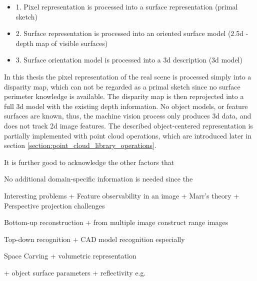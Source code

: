 \documentclass[12pt,a4paper,oneside,pdftex]{report}
\begin{document}
{\begin{itemize}
\label{list:objectcenteredmodeling}
\setlength{\itemsep}{0pt}
\item 1. Pixel representation is processed into a surface representation (primal sketch)
\item 2. Surface representation is processed into an oriented surface model (2.5d - depth map of visible surfaces)
\item 3. Surface orientation model is processed into a 3d description (3d model)
\end{itemize}

\cite{Sonka07}

In this thesis the pixel representation of the real scene is processed simply into a disparity map, which can not be regarded as a primal sketch since no surface perimeter knowledge is available. The disparity map is then reprojected into a full 3d model with the existing depth information. No object models, or feature surfaces are known, thus, the machine vision process only produces 3d data, and does not track 2d image features. The described object-centered representation is partially implemented with point cloud operations, which are introduced later in section \ref{section:point_cloud_library_operations}.

It is further good to acknowledge the other factors that 



























No additional domain-specific information is needed since the 

Interesting problems
+ Feature observability in an image
+ Marr's theory
+ Perspective projection challenges

Bottom-up reconstruction
    + from multiple image construct range images

Top-down recognition
    + CAD model recognition especially

Space Carving
    + volumetric representation


+ object surface parameters
    + reflectivity e.g.
    
}
\end{document}
